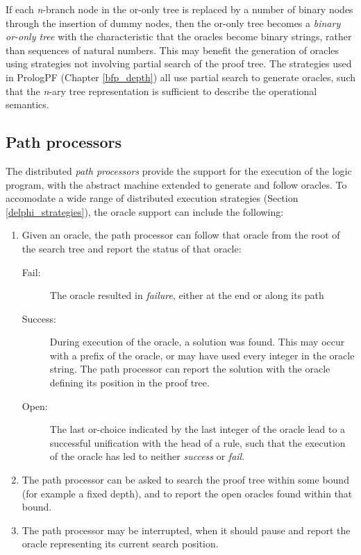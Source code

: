 If each \textit{n}-branch node in the or-only tree is replaced by a
number of binary nodes through the insertion of dummy nodes, then the
or-only tree becomes a \textit{binary or-only tree} with the characteristic
that the oracles become binary strings, rather than sequences of natural numbers.
This may benefit the generation of oracles using strategies not involving
partial search of the proof tree.  The strategies used in PrologPF (Chapter
\ref{bfp_depth}) all use partial search to generate oracles, such that
the \textit{n}-ary tree representation is sufficient to describe the
operational semantics.
 
\subsection{Path processors}
\label{path_processors}

The distributed \textit{path processors} provide the support for the execution of
the logic program, with the abstract machine extended to generate and
follow oracles.  To accomodate a wide range of distributed execution
strategies (Section \ref{delphi_strategies}), the oracle support can
include the following:

\begin{enumerate}
\item{Given an oracle, the path processor can follow that oracle from the
  root of the search tree and report the status of that oracle:
  \begin{description}
  \item[Fail:]{The oracle resulted in  \textit{failure}, either at the end or along 
    its path}
  \item[Success:]{During execution of the oracle, a solution was found.
    This may occur with a prefix of the oracle, or may have
    used every integer in the oracle string.  The path processor can
    report the solution with the oracle defining its position in the
    proof tree.}
  \item[Open:]{The last or-choice indicated by the last integer of the
    oracle lead to a successful unification with the head of a rule, such
    that the execution of the oracle has led to neither \textit{success}
    or \textit{fail}.}
  \end{description}}
\item{The path processor can be asked to search the proof tree within some
  bound (for example a fixed depth), and to report the open oracles found
  within that bound.}
\item{The path processor may be interrupted, when it should pause and report
  the oracle representing its current search position.}
\end{enumerate}

